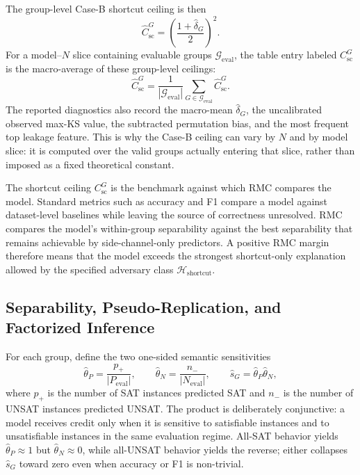 \documentclass[conference]{IEEEtran}
\theoremstyle{remark}
\newcommand{\thetaP}{\hat{\theta}_P}
\newcommand{\thetaN}{\hat{\theta}_N}
\newcommand{\shat}{\hat{s}_G}
\newcommand{\shortcutHypCls}{\mathcal{H}_{\mathrm{shortcut}}}
\newcommand{\shortcutCeiling}{C_{\mathrm{sc}}^{G}}
\newcommand{\hatshortcutCeiling}{\widehat{C}_{\mathrm{sc}}^{G}}
\newcommand{\pp}{p_{+}}
\newcommand{\nm}{n_{-}}
\begin{document}
The group-level Case-B shortcut ceiling is then
\begin{equation}\label{eq:caseb-group-shortcut-ceiling}
\hatshortcutCeiling
=
\left(\frac{1+\hat\delta_G}{2}\right)^2 .
\end{equation}
For a model--$N$ slice containing evaluable groups $\mathcal{G}_{\mathrm{eval}}$,
the table entry labeled $\shortcutCeiling$ is the macro-average of these
group-level ceilings:
\begin{equation}\label{eq:caseb-reported-shortcut-ceiling}
\hatshortcutCeiling
=
\frac{1}{|\mathcal{G}_{\mathrm{eval}}|}
\sum_{G\in\mathcal{G}_{\mathrm{eval}}}
\hatshortcutCeiling .
\end{equation}
The reported diagnostics also record the macro-mean $\hat\delta_G$, the
uncalibrated observed max-KS value, the subtracted permutation bias, and the most
frequent top leakage feature. This is why the Case-B ceiling can vary by $N$ and
by model slice: it is computed over the valid groups actually entering that
slice, rather than imposed as a fixed theoretical constant.

The shortcut ceiling $\shortcutCeiling$ is the benchmark against which RMC compares the model.
Standard metrics such as accuracy and F1 compare a model against dataset-level baselines while leaving the source of correctness unresolved.  RMC compares the model's within-group separability against the best separability that remains achievable by side-channel-only predictors.
A positive RMC margin therefore means that the model exceeds the strongest
shortcut-only explanation allowed by the specified adversary class $\shortcutHypCls$.

\subsection{Separability, Pseudo-Replication, and Factorized Inference}
\label{sec:lcb}

For each group, define the two one-sided semantic sensitivities
\begin{equation}\label{eq:formula-28}
\thetaP=\frac{\pp}{|P_{\mathrm{eval}}|},
\qquad
\thetaN=\frac{\nm}{|N_{\mathrm{eval}}|},
\qquad
\shat=\thetaP\thetaN,
\end{equation}
where $\pp$ is the number of SAT instances predicted SAT and $\nm$ is the
number of UNSAT instances predicted UNSAT.
The product is deliberately conjunctive: a model receives credit only when it is
sensitive to satisfiable instances and to unsatisfiable instances in the same
evaluation regime.  All-SAT behavior yields $\thetaP\approx1$ but
$\thetaN\approx0$, while all-UNSAT behavior yields the reverse; either collapses
$\shat$ toward zero even when accuracy or F1 is non-trivial.
\end{document}
